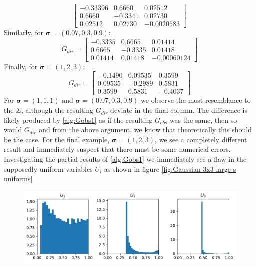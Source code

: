 \documentclass[../Thesis.tex]{subfiles}
\begin{document}
\begin{example}
\begin{equation}
\begin{bmatrix}
            -0.33396 & 0.6660  & 0.02512    \\
            0.6660   & -0.3341 & 0.02730    \\
            0.02512  & 0.02730 & -0.0020583
        \end{bmatrix}
    \end{equation}
    Similarly, for $\boldsymbol\sigma = (0.07, 0.3, 0.9)$:
    \begin{equation} \label{eq:s small G_dir}
        G_{dir} =
        \begin{bmatrix}
            -0.3335 & 0.6665  & 0.01414     \\
            0.6665  & -0.3335 & 0.01418     \\
            0.01414 & 0.01418 & -0.00060124
        \end{bmatrix}
    \end{equation}
    Finally, for $\boldsymbol\sigma = (1,2,3)$:
    $$ G_{dir} =
        \begin{bmatrix}
            -0.1490 & 0.09535 & 0.3599  \\
            0.09535 & -0.2989 & 0.5831  \\
            0.3599  & 0.5831  & -0.4037
        \end{bmatrix}
    $$
    For $\boldsymbol\sigma = (1,1,1)$ and $\boldsymbol\sigma = (0.07, 0.3, 0.9)$ we observe the most resemblance to the $\Sigma$, although the resulting $G_{dir}$ deviate in the final column. The difference is likely produced by \autoref{alg:Gobs1} as if the resulting $G_{obs}$ was the same, then so would $G_{dir}$ and from the above argument, we know that theoretically this should be the case. For the final example, $\boldsymbol\sigma = (1,2,3)$, we see a completely different result and immediately suspect that there must be some numerical errors. Investigating the partial results of \autoref{alg:Gobs1} we immediately see a flaw in the supposedly uniform variables $U_i$ as shown in figure \autoref{fig:Gaussian 3x3 large s uniforms}
    \begin{figure}[H]
        \centering
        \includegraphics[width=0.99\linewidth]{figures/ND examples/Gaussian 3x3 large s uniforms.pdf}

\end{figure}
\end{example}
\end{document}
